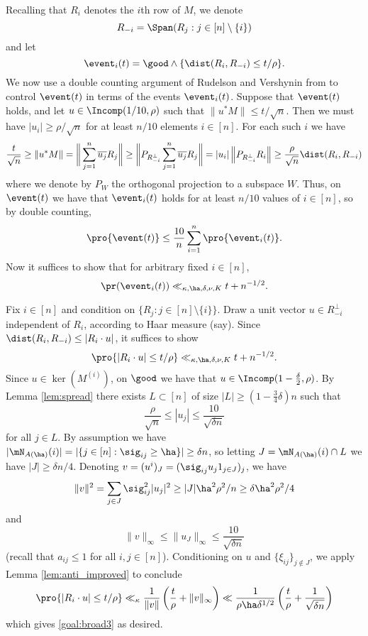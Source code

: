 \documentclass[aop,preprint]{imsart}
\theoremstyle{plain}
\theoremstyle{definition}
\theoremstyle{remark}
\numberwithin{equation}{section}
\numberwithin{theorem}{section}
\begin{document}
Recalling that $R_i$ denotes the $i$th row of $M$, we denote
\begin{equation}
R_{-i} = \Span(R_j: j\in [n]\setminus \{i\})
\end{equation}
and let \begin{equation}
\event_i(t) = \good \wedge \{\dist(R_i,R_{-i}) \le t/\rho\}.
\end{equation}
We now use a double counting argument of Rudelson and Vershynin from \citep{RuVe:ilo} to control $\event(t)$ in terms of the events $\event_i(t)$. 
Suppose that $\event(t)$ holds, and let $u\in \Incomp(1/10, \rho)$ such that $\|u^*M\|\le t/\sqrt{n}$. 
Then we must have $|u_i| \ge \rho/\sqrt{n}$ for at least $n/10$ elements $i\in[n]$. 
For each such $i$ we have
\[
\frac{t}{\sqrt{n}} \ge \|u^*M\| = \bigg\| \sum_{j=1}^n \overline{u_j} R_j\bigg\| 
\ge \bigg\| P_{R_{-i}^\perp}  \sum_{j=1}^n \overline{u_j} R_j\bigg\| 
= |u_i| \left\| P_{R_{-i}^\perp} R_i\right\| 
\ge \frac{\rho}{\sqrt{n}} \dist(R_i,R_{-i})
\]
where we denote by $P_W$ the orthogonal projection to a subspace $W$.
Thus, on $\event(t)$ we have that $\event_i(t)$ holds for at least $n/10$ values of $i\in[n]$, so by double counting,
\begin{equation}
\pro{ \event(t)} \le \frac{10}{n} \sum_{i=1}^n \pro{\event_i(t)}.
\end{equation}
Now it suffices to show that for arbitrary fixed $i\in [n]$,
\begin{equation}	\label{goal:broad2}
\pr(\event_i(t)) \ll_{\kappa,\ha,\delta,\nu,K} t + n^{-1/2}.
\end{equation}

Fix $i\in [n]$ and condition on $\{R_j: j\in [n]\setminus \{i\}\}$.
Draw a unit vector $u\in R_{-i}^\perp$ independent of $R_i$, according to Haar measure (say). 
Since $\dist(R_i,R_{-i}) \le |R_i\cdot u|$, it suffices to show
\begin{equation}	\label{goal:broad3}
\pro{|R_i\cdot u|\le t/\rho } \ll_{\kappa,\ha,\delta,\nu,K} t + n^{-1/2}.
\end{equation}
Since $u\in \ker(M^{(i)})$, on $\good$ we have that $u\in \Incomp(1-\frac\delta2,\rho)$.
By Lemma \ref{lem:spread} there exists $L\subset [n]$ of size $|L| \ge (1-\frac34\delta)n$ such that
\[
\frac{\rho}{\sqrt{n}} \le |u_j| \le \frac{10}{\sqrt{\delta n}}
\]
for all $j\in L$.
By assumption we have $|\mN_{A(\ha)}(i)| = |\{ j\in [n]: \sig_{ij} \ge \ha\}| \ge \delta n$, 
so letting $J=\mN_{A(\ha)}(i)\cap L$ we have $|J|\ge \delta n/4$. 
Denoting $v= (u^i)_J = (\sig_{ij} u_j 1_{j\in J})_j$, we have
\[
\|v\|^2 = \sum_{j\in J} \sig_{ij}^2 |u_j|^2 \ge |J|\ha^2 \rho^2/n \ge \delta\ha^2\rho^2/4
\]
and
\[
\|v\|_\infty \le \|u_J\|_{\infty} \le \frac{10}{\sqrt{\delta n}}
\]
(recall that $a_{ij}\le 1$ for all $i,j\in [n]$).
Conditioning on $u$ and $\{\xi_{ij}\}_{j\notin J}$, we apply Lemma \ref{lem:anti_improved} to conclude
\begin{align*}
\pro{ |R_i\cdot u| \le t/\rho} \ll_\kappa \frac{1}{\|v\|}\left( \frac{t}{\rho} + \|v\|_\infty\right) \ll \frac{1}{\rho\ha\delta^{1/2}} \left(\frac{t}\rho + \frac{1}{\sqrt{\delta n}}\right)
\end{align*}
which gives \eqref{goal:broad3} as desired.
\end{document}
